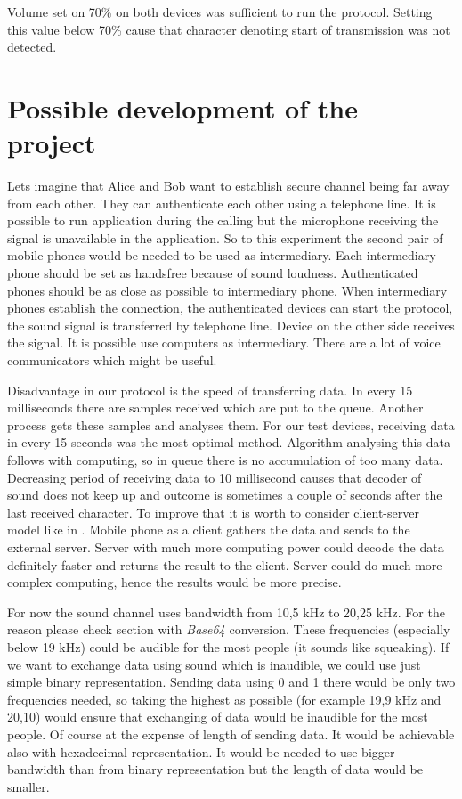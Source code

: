 \documentclass[11pt,titlepage]{article}
\theoremstyle{plain}
\begin{document}
\vspace{5mm}

Volume set on 70\% on both devices was sufficient to run the protocol. Setting this value below 70\% cause that character denoting start of transmission was not detected.

\section{Possible development of the project}
Lets imagine that Alice and Bob want to establish secure channel being far away from each other. They can authenticate each other using a telephone line. It is possible to run application during the calling but the microphone receiving the signal is unavailable in the application. So to this experiment the second pair of mobile phones would be needed to be used as intermediary. Each intermediary phone should be set as handsfree because of sound loudness. Authenticated phones should be as close as possible to intermediary phone. When intermediary phones establish the connection, the authenticated devices can start the protocol, the sound signal is transferred by telephone line. Device on the other side receives the signal. It is possible use computers as intermediary. There are a lot of voice communicators which might be useful.

\vspace{5mm}

Disadvantage in our protocol is the speed of transferring data. In every 15 milliseconds there are samples received which are put to the queue. Another process gets these samples and analyses them. For our test devices, receiving data in every 15 seconds was the most optimal method. Algorithm analysing this data follows with computing, so in queue there is no accumulation of too many data. Decreasing period of receiving data to 10 millisecond causes that decoder of sound does not keep up and outcome is sometimes a couple of seconds after the last received character. To improve that it is worth to consider client-server model like in \cite{chirp}. Mobile phone as a client gathers the data and sends to the external server. Server with much more computing power could decode the data definitely faster and returns the result to the client. Server could do much more complex computing, hence the results would be more precise.

\vspace{5mm}

For now the sound channel uses bandwidth from 10,5 kHz to 20,25 kHz. For the reason please check section with \textit{Base64} conversion. These frequencies (especially below 19 kHz) could be audible for the most people (it sounds like squeaking). If we want to exchange data using sound which is inaudible, we could use just simple binary representation. Sending data using 0 and 1 there would be only two frequencies needed, so taking the highest as possible (for example 19,9 kHz and 20,10) would ensure that exchanging of data would be inaudible for the most people. Of course at the expense of length of sending data. It would be achievable also with hexadecimal representation. It would be needed to use bigger bandwidth than from binary representation but the length of data would be smaller.
\end{document}
